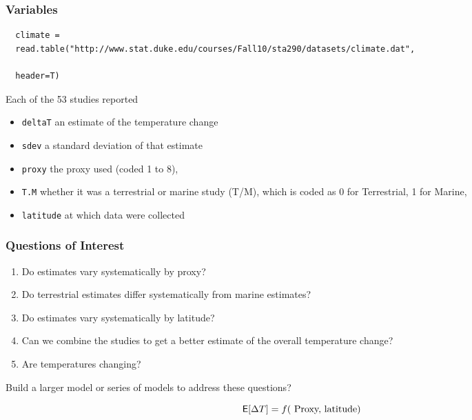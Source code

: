 \documentclass[handout]{beamer}
\begin{document}
\begin{frame}[fragile]
  \frametitle{Variables}
  \begin{tiny}
\begin{verbatim}
  climate =
  read.table("http://www.stat.duke.edu/courses/Fall10/sta290/datasets/climate.dat",

  header=T)
\end{verbatim}

\end{tiny}
\pause
Each of the 53 studies reported
\begin{itemize}
\item {\tt deltaT} an estimate of the temperature change \pause
\item {\tt sdev}  a standard deviation of that
estimate \pause
\item {\tt proxy}  the proxy used (coded 1 to 8),  \pause
\item {\tt T.M} whether it was a
terrestrial or marine study (T/M), which is coded as 0 for
Terrestrial, 1 for Marine,  \pause
\item {\tt latitude} at which data were collected
\end{itemize}
\end{frame}

\begin{frame}
  \frametitle{Questions of Interest}
  \begin{enumerate}
  \item Do estimates vary systematically by proxy? \pause
  \item Do terrestrial estimates differ systematically from marine
    estimates? \pause
\item Do estimates vary systematically by latitude? \pause
\item Can we combine the studies to get a better estimate of the
  overall temperature change?  \pause
\item Are temperatures changing?  \pause
  \end{enumerate}

Build a larger  model or series of models to address these questions?

$$\textsf{E}[\Delta T ] = f(\text{ Proxy, latitude})$$
\end{frame}
\end{document}
